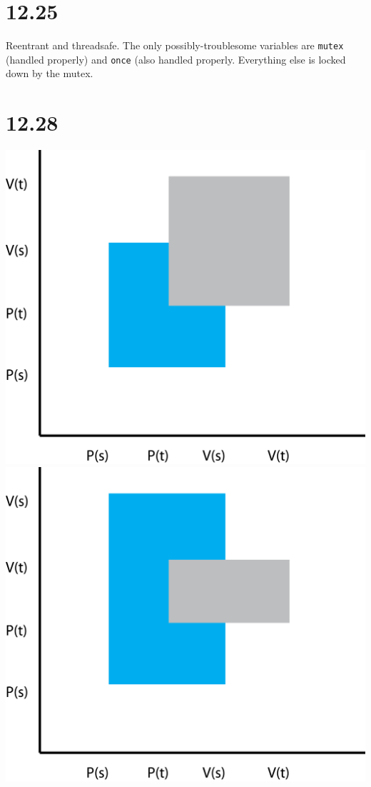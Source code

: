 \documentclass[fleqn]{article}
\begin{document}

\section*{12.25}

Reentrant and threadsafe. The only possibly-troublesome variables are \texttt{mutex} (handled properly) and \texttt{once} (also handled properly. Everything else is locked down by the mutex.

\section*{12.28}

\includegraphics[scale=0.25]{1.png}
\includegraphics[scale=0.25]{2.png}
\end{document}
